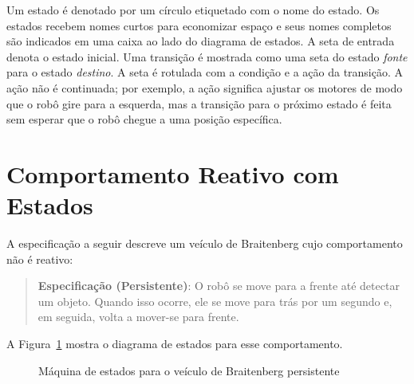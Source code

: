 Um estado é denotado por um círculo etiquetado com o nome do estado. Os estados recebem nomes curtos para economizar espaço e seus nomes completos são indicados em uma caixa ao lado do diagrama de estados. A seta de entrada denota o estado inicial. Uma transição é mostrada como uma seta do estado \emph{fonte} para o estado \emph{destino}. A seta é rotulada com a condição e a ação da transição. A ação não é continuada; por exemplo, a ação  significa ajustar os motores de modo que o robô gire para a esquerda, mas a transição para o próximo estado é feita sem esperar que o robô chegue a uma posição específica.

\section{Comportamento Reativo com Estados}\label{s.reactive-state}

A especificação a seguir descreve um veículo de Braitenberg cujo comportamento não é reativo:

\begin{quote}
\normalsize\noindent\textbf{Especificação (Persistente)}: O robô se move para a frente até detectar um objeto. Quando isso ocorre, ele se move para trás por um segundo e, em seguida, volta a mover-se para frente.
\end{quote}
A Figura~\ref{fig.persistent} mostra o diagrama de estados para esse comportamento.

\begin{figure}
\begin{center}
\caption{Máquina de estados para o veículo de Braitenberg persistente}\label{fig.persistent}
\end{center}
\end{figure}

